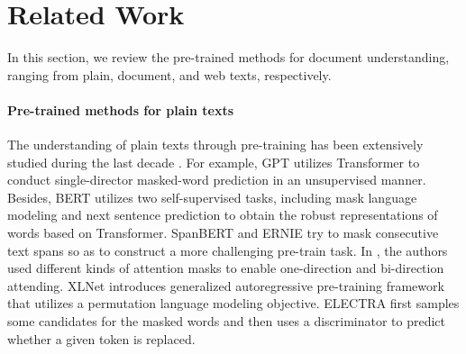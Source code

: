 \documentclass[11pt]{article}
\begin{document}
\section{Related Work}
In this section, we review the pre-trained methods for document understanding, ranging from plain, document, and web texts, respectively.

\paragraph{Pre-trained methods for plain texts} The understanding of plain texts through pre-training has been extensively studied during the last decade \cite{devlin2018bert,yang2019xlnet,bao2020unilmv2,liu2019roberta,lewis2019bart,lan2019albert,jiang2020convbert,he2020deberta,dong2019unified,lample2019cross,lin2021few,xue2020mt5}. For example, GPT \cite{radford2019language,brown2020language} utilizes Transformer \cite{vaswani2017attention} to conduct single-director masked-word prediction in an unsupervised manner. Besides, BERT \cite{devlin2018bert} utilizes two self-supervised tasks, including mask language modeling and next sentence prediction to obtain the robust representations of words based on Transformer. SpanBERT \cite{joshi2020spanbert} and ERNIE \cite{zhang2019ernie} try to mask consecutive text spans so as to construct a more challenging pre-train task. In \cite{dong2019unified}, the authors used different kinds of attention masks to enable one-direction and bi-direction attending. XLNet \cite{yang2019xlnet} introduces generalized 
autoregressive pre-training framework that utilizes a permutation language modeling objective. ELECTRA \cite{clark2020electra} first samples some candidates for the masked words and then uses a discriminator to predict whether a given token is replaced.
\end{document}
